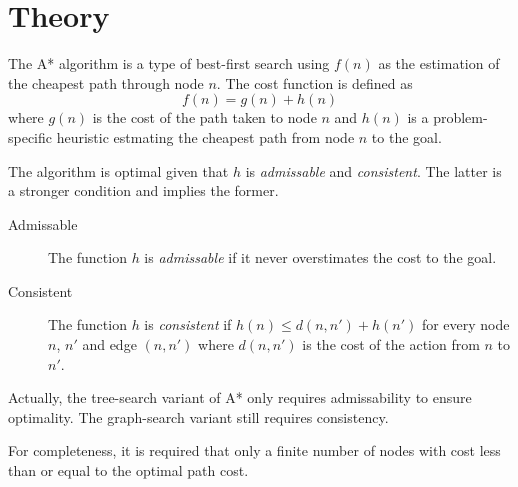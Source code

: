 \section{Theory}

The A* algorithm is a type of best-first search using $f(n)$ as the estimation of the cheapest path through node $n$. The cost function is defined as
\[
f(n) = g(n) + h(n)
\]
where $g(n)$ is the cost of the path taken to node $n$ and $h(n)$ is a problem-specific heuristic estmating the cheapest path from node $n$ to the goal.

The algorithm is optimal given that $h$ is \emph{admissable} and \emph{consistent}. The latter is a stronger condition and implies the former.

\begin{description}
\item[Admissable] The function $h$ is \emph{admissable} if it never overstimates the cost to the goal.

\item[Consistent] The function $h$ is \emph{consistent} if $h(n) \leq d(n, n') + h(n')$ for every node $n$, $n'$ and edge $(n, n')$ where $d(n,n')$ is the cost of the action from $n$ to $n'$.
\end{description}

Actually, the tree-search variant of A* only requires admissability to ensure optimality. The graph-search variant still requires consistency.

For completeness, it is required that only a finite number of nodes with cost less than or equal to the optimal path cost.
